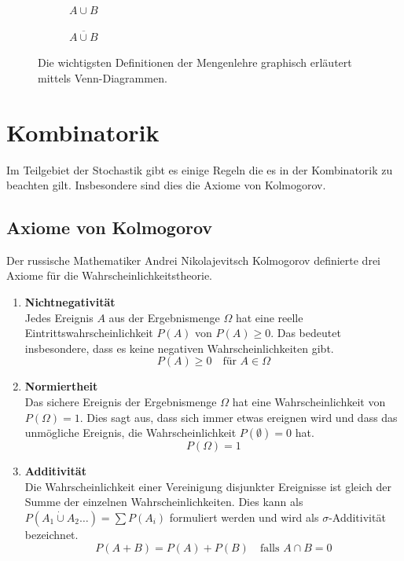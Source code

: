 \begin{figure}[h!]
	\rule[1mm]{0mm}{5mm}

	\begin{subfigure}[b]{0.45\textwidth}
		\centering
		\begin{venndiagram2sets}[tikzoptions={scale=0.7}]
			\fillA \fillB
		\end{venndiagram2sets}
		\caption{$A \cup B$}
	\end{subfigure}	
	\begin{subfigure}[b]{0.45\textwidth}
		\centering
		\begin{venndiagram2sets}[tikzoptions={scale=0.7}]
			\fillNotAorB
		\end{venndiagram2sets}
		\caption{$\overline{A \cup B}$}
	\end{subfigure}
	\caption{Die wichtigsten Definitionen der Mengenlehre graphisch
	erläutert mittels Venn-Diagrammen.}
\end{figure}

\section{Kombinatorik}
Im Teilgebiet der Stochastik gibt es einige Regeln die es in der 
Kombinatorik zu beachten gilt. Insbesondere sind dies die Axiome von
Kolmogorov.

\subsection{Axiome von Kolmogorov}
Der russische Mathematiker Andrei Nikolajevitsch Kolmogorov definierte
drei Axiome für die Wahrscheinlichkeitstheorie.
\begin{enumerate}
	\item \textbf{Nichtnegativität} \\
		Jedes Ereignis $A$ aus der Ergebnismenge $\Omega$ hat eine 
		reelle Eintrittswahrscheinlichkeit $P(A)$ von 
		$P(A) \geq 0$. Das bedeutet insbesondere, dass es 
		keine negativen Wahrscheinlichkeiten gibt.
		\[ P(A) \geq 0 \quad \text{für } A \in \Omega \] 
	\item \textbf{Normiertheit} \\
		Das sichere Ereignis der Ergebnismenge $\Omega$ hat eine
		Wahrscheinlichkeit von $P(\Omega)=1$. Dies sagt aus, dass
		sich immer etwas ereignen wird und dass das unmögliche
		Ereignis, die Wahrscheinlichkeit $P(\emptyset)=0$ hat.
		\[ P(\Omega) = 1 \]
	\item \textbf{Additivität} \\
		Die Wahrscheinlichkeit einer Vereinigung disjunkter 
		Ereignisse ist gleich der Summe der einzelnen 
		Wahrscheinlichkeiten. Dies kann als 
		$P(A_1 \dot\cup A_2  \dots ) = \sum P(A_i)$ 
		formuliert werden und wird als $\sigma$-Additivität
		bezeichnet.
		\[ P(A+B) = P(A)+P(B) \quad \text{falls } A \cap B = 0 \]
\end{enumerate}

